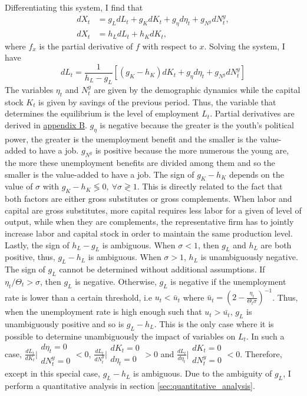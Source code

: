 Differentiating this system, I find that
	\begin{align*}
		dX_t &= g_L dL_t + g_K dK_t + g_\eta d\eta_t + g_{N^y} dN_t^y, \\
		dX_t &= h_L dL_t + h_K dK_t,
	\end{align*}
where $f_x$ is the partial derivative of $f$ with respect to $x$. Solving the system, I have
	\begin{equation*}
		dL_t = \frac{1}{h_L-g_L}\left[(g_K-h_K) dK_t + g_\eta d\eta_t + g_{N^y} dN_t^y \right]
	\end{equation*}
The variables $\eta_t$ and $N_t^y$ are given by the demographic dynamics while the capital stock $K_t$ is given by savings of the previous period. Thus, the variable that determines the equilibrium is the level of employment $L_t$. Partial derivatives are derived in \hyperref[appendix:derivatives]{appendix B}. $g_\eta$ is negative because the greater is the youth's political power, the greater is the unemployment benefit and the smaller is the value-added to have a job. $g_{N^y}$ is positive because the more numerous the young are, the more these unemployment benefits are divided among them and so the smaller is the value-added to have a job. The sign of $g_K-h_K$ depends on the value of $\sigma$ with $g_K-h_K \lessgtr 0, ~ \forall \sigma \gtrless 1$. This is directly related to the fact that both factors are either gross substitutes or gross complements. When labor and capital are gross substitutes, more capital requires less labor for a given of level of output, while when they are complements, the representative firm has to jointly increase labor and capital stock in order to maintain the same production level. Lastly, the sign of $h_L-g_L$ is ambiguous. When $\sigma < 1$, then $g_L$ and $h_L$ are both positive, thus, $g_L-h_L$ is ambiguous. When $\sigma > 1$, $h_L$ is unambiguously negative. The sign of $g_L$ cannot be determined without additional assumptions. If $\eta_t/\Theta_t > \sigma$, then $g_L$ is negative. Otherwise, $g_L$ is negative if the unemployment rate is lower than a certain threshold, i.e $u_t < \bar{u}_t$ where $\bar{u}_t = \left(2 - \frac{\eta_t}{\Theta_t\sigma}\right)^{-1}$. Thus, when the unemployment rate is high enough such that $u_t > \bar{u_t}$, $g_L$ is unambiguously positive and so is $g_L-h_L$. This is the only case where it is possible to determine unambiguously the impact of variables on $L_t$. In such a case, $\frac{dL_t}{dK_t}\Bigr|{\substack{d\eta_t = 0\\dN_t^y = 0}} < 0$, $\frac{dL_t}{dN^y_t}\Bigr|{\substack{dK_t = 0\\d\eta_t = 0}} > 0$ and $\frac{dL_t}{d\eta_t}\Bigr|{\substack{dK_t = 0\\dN_t^y = 0}} < 0$. Therefore, except in this special case, $g_L-h_L$ is ambiguous. Due to the ambiguity of $g_L$, I perform a quantitative analysis in section \ref{sec:quantitative_analysis}.